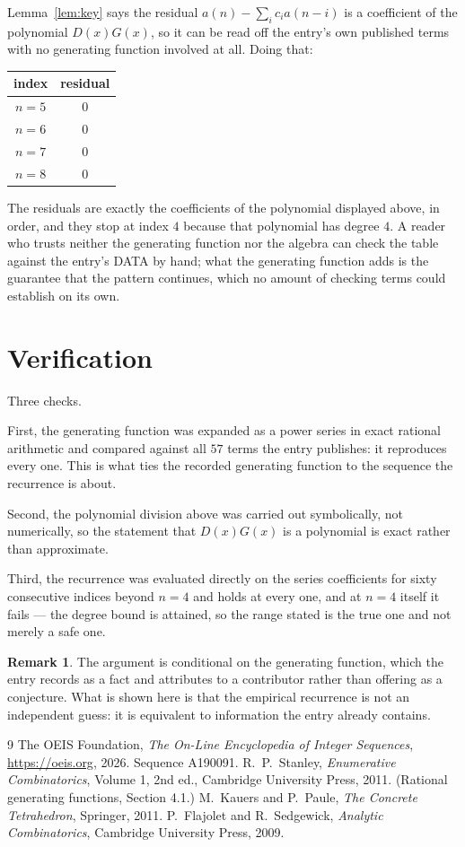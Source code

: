 \documentclass[11pt,a4paper]{article}
\theoremstyle{plain}
\theoremstyle{definition}
\newtheorem{remark}[theorem]{Remark}
\begin{document}
Lemma~\ref{lem:key} says the residual $a(n)-\sum_ic_ia(n-i)$ is a coefficient of the
polynomial $D(x)G(x)$, so it can be read off the entry's own published terms with no
generating function involved at all. Doing that:
\begin{center}
\begin{tabular}{cc}
index & residual \\ \hline
$n=5$ & $0$ \\
$n=6$ & $0$ \\
$n=7$ & $0$ \\
$n=8$ & $0$
\end{tabular}
\end{center}
The residuals are exactly the coefficients of the polynomial displayed above, in order, and
they stop at index $4$ because that polynomial has degree $4$. A reader who trusts
neither the generating function nor the algebra can check the table against the entry's DATA
by hand; what the generating function adds is the guarantee that the pattern continues, which
no amount of checking terms could establish on its own.

\section{Verification}

Three checks.

First, the generating function was expanded as a power series in exact rational arithmetic and
compared against all $57$ terms the entry publishes: it reproduces every one. This is
what ties the recorded generating function to the sequence the recurrence is about.

Second, the polynomial division above was carried out symbolically, not numerically, so the
statement that $D(x)G(x)$ is a polynomial is exact rather than approximate.

Third, the recurrence was evaluated directly on the series coefficients for sixty consecutive
indices beyond $n=4$ and holds at every one, and at $n=4$ itself it fails --- the
degree bound is attained, so the range stated is the true one and not merely a safe one.

\begin{remark}
The argument is conditional on the generating function, which the entry records as a fact and
attributes to a contributor rather than offering as a conjecture. What is shown here is that
the empirical recurrence is not an independent guess: it is equivalent to information the
entry already contains.
\end{remark}

\begin{thebibliography}{9}
 The OEIS Foundation, \emph{The On-Line Encyclopedia of Integer
Sequences}, \url{https://oeis.org}, 2026. Sequence A190091.
 R.~P.~Stanley, \emph{Enumerative Combinatorics}, Volume 1, 2nd ed.,
Cambridge University Press, 2011. (Rational generating functions, Section 4.1.)
 M.~Kauers and P.~Paule, \emph{The Concrete Tetrahedron}, Springer, 2011.
 P.~Flajolet and R.~Sedgewick, \emph{Analytic Combinatorics}, Cambridge
University Press, 2009.
\end{thebibliography}
\end{document}
